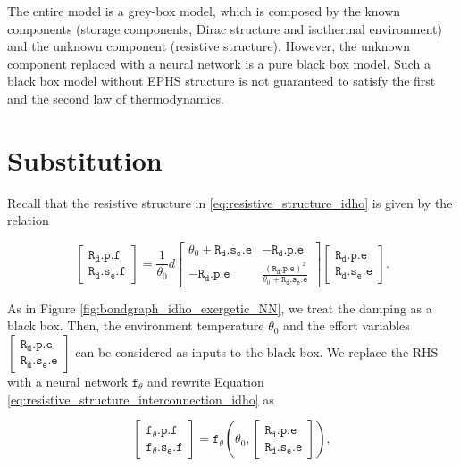 \documentclass[
	parskip, 			   %
	twoside, 			   %
	DIV=14, 			   %
	BCOR=15.0mm, 		   %
	headsepline, 		   %
	open=right, 		   %
	captions=tableheading, %
	bibliography=totoc,    %
	numbers=noenddot       %
]{scrreprt}
\begin{document}
The entire model is a grey-box model, which is composed by the known components (storage components, Dirac structure and isothermal environment) and the unknown component (resistive structure). However, the unknown component replaced with a neural network is a pure black box model. Such a black box model without EPHS structure is not guaranteed to satisfy the first and the second law of thermodynamics.


\section{Substitution}

Recall that the resistive structure in \ref{eq:resistive_structure_idho} is given by the relation

\begin{equation}
    \label{eq:resistive_structure_interconnection_idho}
    \left[\begin{array}{l}\mathtt{R_{d}.p.f} \\ \mathtt{R_{d}.s_{e}.f}\end{array}\right]=\frac{1}{\theta_0} d\left[\begin{array}{rr}\theta_0+\mathtt{R_{d}.s_{e}.e} & -\mathtt{R_{d}.p.e} \\ -\mathtt{R_{d}.p.e} & \frac{(\mathtt{R_{d}.p.e})^2}{\theta_0+\mathtt{R_{d}.s_{e}.e}}\end{array}\right]\left[\begin{array}{l}\mathtt{R_{d}.p.e} \\ \mathtt{R_{d}.s_{e}.e}\end{array}\right].
\end{equation}

As in Figure \ref{fig:bondgraph_idho_exergetic_NN}, we treat the damping as a black box. Then, the environment temperature $\theta_0$ and the effort variables $\left[\begin{array}{l}\mathtt{R_{d}.p.e} \\ \mathtt{R_{d}.s_{e}.e}\end{array}\right]$ can be considered as inputs to the black box. We replace the RHS with a neural network $\mathtt{f_{\theta}}$ and rewrite Equation \ref{eq:resistive_structure_interconnection_idho} as

\begin{equation}
    \label{eq:resistive_structure_interconnection_NN_idho}
    \left[\begin{array}{l}\mathtt{f_{\theta}.p.f} \\ \mathtt{f_{\theta}.s_{e}.f}\end{array}\right]= \mathtt{f_{\theta}} \left(\theta_0, 
    \left[\begin{array}{l}\mathtt{R_{d}.p.e} \\ \mathtt{R_{d}.s_{e}.e}\end{array}\right] \right),
\end{equation}
\end{document}
